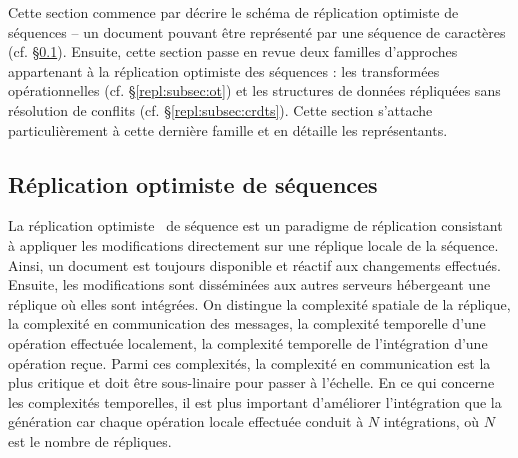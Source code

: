 Cette section commence par décrire le schéma de réplication optimiste de
séquences -- un document pouvant être représenté par une séquence de caractères
(cf. §\ref{repl:subsec:optimistic}).  Ensuite, cette section passe en revue deux
familles d'approches appartenant à la réplication optimiste des séquences : les
transformées opérationnelles (cf. §\ref{repl:subsec:ot}) et les structures de
données répliquées sans résolution de conflits
(cf. §\ref{repl:subsec:crdts}). Cette section s'attache particulièrement à cette
dernière famille et en détaille les représentants.

\subsection{Réplication optimiste de séquences}
\label{repl:subsec:optimistic}


La réplication optimiste~\cite{demers1987epidemic, johnson1975maintenance,
  ladin1992providing, saito2005optimistic} de séquence est un paradigme de
réplication consistant à appliquer les modifications directement sur une
réplique locale de la séquence.  Ainsi, un document est toujours disponible et
réactif aux changements effectués. Ensuite, les modifications sont disséminées
aux autres serveurs hébergeant une réplique où elles sont intégrées. On
distingue la complexité spatiale de la réplique, la complexité en communication
des messages, la complexité temporelle d'une opération effectuée localement, la
complexité temporelle de l'intégration d'une opération reçue. Parmi ces
complexités, la complexité en communication est la plus critique et doit être
sous-linaire pour passer à l'échelle. En ce qui concerne les complexités
temporelles, il est plus important d'améliorer l'intégration que la génération
car chaque opération locale effectuée conduit à $N$ intégrations, où $N$ est le
nombre de répliques.


